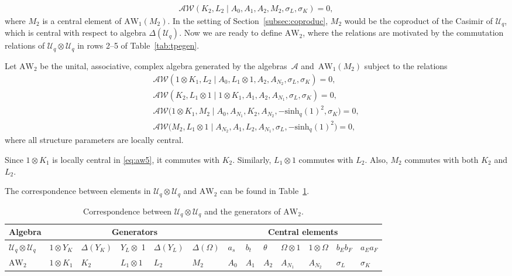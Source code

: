 \documentclass[pdftex]{sigma}
\numberwithin{equation}{section}
\newcommand{\awc}[2]{\mathrm{AW}_{#1}\!\left(#2\right)}
\newcommand{\AW}[1]{\mathrm{AW}_{#1}}
\newcommand{\awr}{\mathscr{A}\!\!\mathscr{W}}
\newcommand{\shq}{\mathrm{sinh}_q}
\newcommand{\Uq}{\mathcal{U}_q}
\begin{document}
\begin{gather}
	\awr(K_2,L_2\mid A_0,A_1,A_2,M_2,\sigma_L,\sigma_K)=0,\label{eq:aw1(M2)}
\end{gather}
where $M_2$ is a central element of $\awc{1}{M_2}$. In the setting of Section~\ref{subsec:coproduc}, $M_2$ would be the coproduct of the Casimir of $\Uq$, which is central with respect to algebra $\Delta(\Uq)$. Now we are ready to define $\AW{2}$, where the relations are motivated by the commutation relations of $\Uq\otimes\Uq$ in rows 2--5 of Table~\ref{tab:tpegen}.
\begin{Definition} \label{Def:AW2}
	Let $\AW{2}$ be the unital, associative, complex algebra generated by the algebras~$\mathscr{A}$ and~$\awc{1}{M_2}$ subject to the relations
	\begin{gather}
		\awr(1\otimes K_1,L_2\mid A_0,L_1\otimes 1,A_2,A_{N_2},\sigma_L,\sigma_K)=0,\label{eq:aw4}\\
		\awr(K_2,L_1\otimes 1\mid 1\otimes K_1,A_1,A_2,A_{N_1},\sigma_L,\sigma_K)=0,\label{eq:aw5}\\
		\awr\big(1\otimes K_1,M_2\mid A_0,A_{N_1},K_2,A_{N_2},-\shq(1)^{2},\sigma_K\big)=0,\label{eq:aw6}\\
		\awr\big(M_2,L_1\otimes 1\mid A_{N_2},A_1,L_2,A_{N_1},\sigma_L,-\shq(1)^{2}\big)=0,\label{eq:aw7}
	\end{gather}
	where all structure parameters are locally central.
\end{Definition}
\begin{Remark}
	Since $1\otimes K_1$ is locally central in \eqref{eq:aw5}, it commutes with $K_2$. Similarly, $L_1\otimes 1$ commutes with $L_2$. Also, $M_2$ commutes with both $K_2$ and $L_2$.
\end{Remark}
\noindent The correspondence between elements in $\Uq\otimes\Uq$ and $\AW{2}$ can be found in Table~\ref{tab:correspondenceuqaw}.
\begin{table}[h]\centering \renewcommand{\arraystretch}{1.2}\small
	\begin{tabular}{|@{\,\,}l@{\,\,}|l|l|l|l|l|l|l|l|l|l|l|l@{\,\,}|}
		\hline
		Algebra & \multicolumn{5}{c|}{Generators} & \multicolumn{7}{c|}{Central elements} \\ \hline
		$ \Uq \otimes \Uq $ &$ 1 \otimes Y_K $& $ \Delta(Y_K) $& $ Y_L\otimes $ 1& $ \Delta(Y_L) $& $ \Delta(\Omega) $& $ a_s $& $ b_t $& $ \theta $& $ \Omega \otimes 1$ & $ 1 \otimes \Omega $& $ b_Eb_F $& $ a_Ea_F $ \\ \hline
		$ \AW{2} $ & $ 1\otimes K_1 $ &$ K_2 $&$ L_1 \otimes 1 $&$ L_2 $& $ M_2 $& $ A_0 $& $ A_1 $& $ A_2 $& $ A_{N_1} $&$ A_{N_2} $&$ \sigma_L $&$ \sigma_K $ \\ \hline
	\end{tabular}
\caption{Correspondence between $\Uq\otimes\Uq$ and the generators of $\AW{2}$. }\label{tab:correspondenceuqaw}
\end{table}
\end{document}
